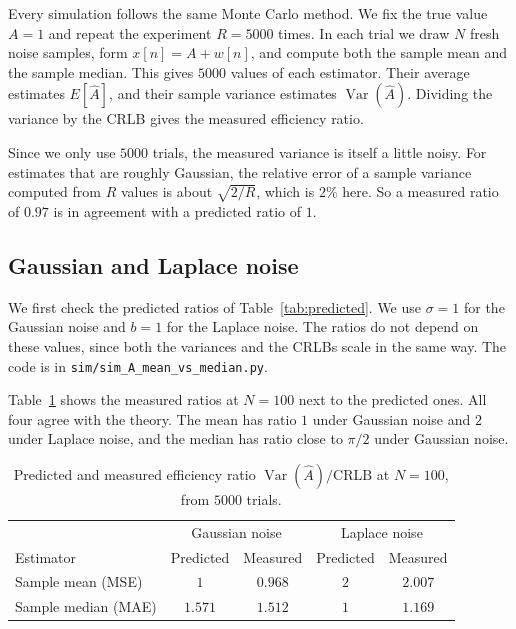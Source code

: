 \documentclass[11pt]{article}
\numberwithin{figure}{section}
\numberwithin{equation}{section}
\begin{document}
Every simulation follows the same Monte Carlo method. We fix the true value $A = 1$ and repeat
the experiment $R = 5000$ times. In each trial we draw $N$ fresh noise samples, form
$x[n] = A + w[n]$, and compute both the sample mean and the sample median. This gives $5000$
values of each estimator. Their average estimates $E[\hat A]$, and their sample variance
estimates $\operatorname{Var}(\hat A)$. Dividing the variance by the CRLB gives the measured
efficiency ratio.

Since we only use $5000$ trials, the measured variance is itself a little noisy. For estimates that
are roughly Gaussian, the relative error of a sample variance computed from $R$ values is about
$\sqrt{2/R}$, which is $2\%$ here. So a measured ratio of $0.97$ is in agreement with a predicted
ratio of $1$.

\subsection{Gaussian and Laplace noise}
\label{sec:simA}

We first check the predicted ratios of Table~\ref{tab:predicted}. We use $\sigma = 1$ for the
Gaussian noise and $b = 1$ for the Laplace noise. The ratios do not depend on these values, since
both the variances and the CRLBs scale in the same way. The code is in
\texttt{sim/sim\_A\_mean\_vs\_median.py}.

Table~\ref{tab:simA} shows the measured ratios at $N = 100$ next to the predicted ones. All four
agree with the theory. The mean has ratio $1$ under Gaussian noise and $2$ under Laplace noise,
and the median has ratio close to $\pi/2$ under Gaussian noise.

\begin{table}[H]
\centering
\begin{tabular}{lcccc}
\toprule
 & \multicolumn{2}{c}{Gaussian noise} & \multicolumn{2}{c}{Laplace noise} \\
Estimator & Predicted & Measured & Predicted & Measured \\
\midrule
Sample mean (MSE)   & $1$    & $0.968$ & $2$ & $2.007$ \\
Sample median (MAE) & $1.571$ & $1.512$ & $1$ & $1.169$ \\
\bottomrule
\end{tabular}
\caption{Predicted and measured efficiency ratio $\operatorname{Var}(\hat A)/\text{CRLB}$ at
$N = 100$, from $5000$ trials.}
\label{tab:simA}
\end{table}
\end{document}
